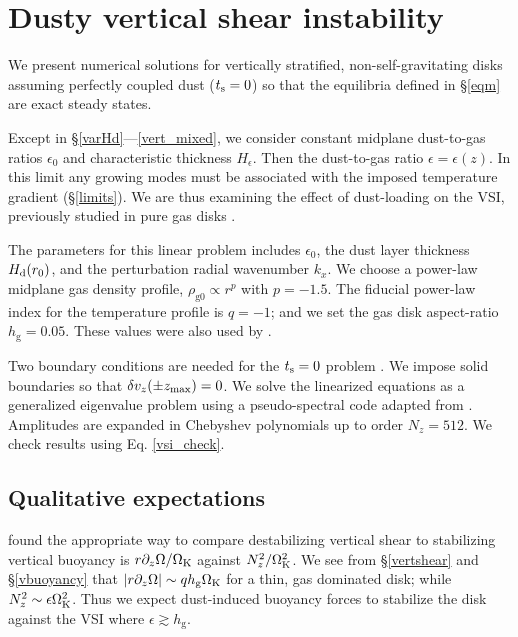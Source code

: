 \section{
  Dusty vertical shear instability}\label{results} 

We present numerical solutions for vertically stratified,
non-self-gravitating disks assuming perfectly coupled dust
($t_\mathrm{s}=0$) so that the equilibria defined in \S\ref{eqm} 
are exact steady states. 

Except in \S\ref{varHd}---\ref{vert_mixed}, we consider constant midplane dust-to-gas
ratios $\epsilon_0$ and characteristic thickness $H_\epsilon$. Then
the dust-to-gas ratio $\epsilon=\epsilon(z)$. In this limit any
growing modes must be associated with the imposed temperature gradient
(\S\ref{limits}). We are thus examining the effect of dust-loading on
the VSI, previously studied in pure gas disks
\citep[][ in this section]{lin15}.   

The parameters for this linear problem includes $\epsilon_0$, the dust
layer thickness $H_\mathrm{d}(r_0)$, and the perturbation radial wavenumber
$k_x$. We choose a power-law midplane gas density profile,
$\rho_\mathrm{g0}\propto r^p$ with $p = -1.5$. The fiducial power-law
index for the temperature profile is $q=-1$; and we set the gas disk
aspect-ratio $h_\mathrm{g}=0.05$. These values were also used by  
. 

Two boundary conditions are needed for the $t_\mathrm{s}=0$
problem \citep[e.g.][]{lubow93}. We impose solid boundaries so that
$\delta v_z(\pm z_\mathrm{max})=0$. We solve the linearized equations as a
generalized eigenvalue problem using a pseudo-spectral code adapted
from . Amplitudes are expanded in Chebyshev
polynomials up to order $N_z=512$. We check results using
Eq. \ref{vsi_check}.      

\subsection{Qualitative expectations}\label{vsi_est}
 found the appropriate way to compare 
destabilizing vertical shear to stabilizing vertical buoyancy is
$r\partial_z\Omega/\Omega_{\rm K}$ against $N_z^2/\Omega_{\rm K}^2$. We see from \S\ref{vertshear}
and \S\ref{vbuoyancy} that $|r\partial_z\Omega|\sim q h_\mathrm{g}\Omega_{\rm K}$ for a
thin, gas dominated disk; while $N_z^2\sim \epsilon\Omega_{\rm K}^2$. Thus we
expect dust-induced buoyancy forces to stabilize the disk against the
VSI where $\epsilon \gtrsim h_\mathrm{g}$. 

